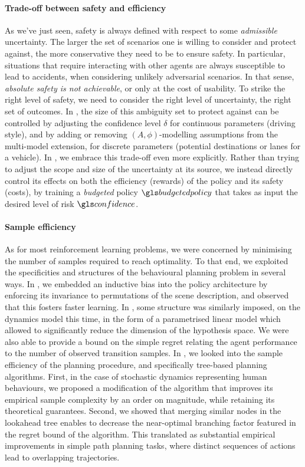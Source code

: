 \paragraph{Trade-off between safety and efficiency}
As we've just seen, safety is always defined with respect to some \emph{admissible} uncertainty. The larger the set of scenarios one is willing to consider and protect against, the more conservative they need to be to ensure safety. In particular, situations that require interacting with other agents are always susceptible to lead to accidents, when considering unlikely adversarial scenarios. In that sense, \emph{absolute safety is not achievable}, or only at the cost of usability. To strike the right level of safety, we need to consider the right level of uncertainty, the right set of outcomes. In , the size of this ambiguity set to protect against can be controlled by adjusting the confidence level $\delta$ for continuous parameters (\eg driving style), and by adding or removing $(A,\phi)$-modelling assumptions from the multi-model extension, for discrete parameters (\eg potential destinations or lanes for a vehicle). In , we embrace this trade-off even more explicitly. Rather than trying to adjust the scope and size of the uncertainty at its source, we instead directly control its effects on both the efficiency (rewards) of the policy and its safety (costs), by training a \emph{budgeted} policy $\budgetedpolicy$ that takes as input the desired level of risk $\confidence$.

\paragraph{Sample efficiency}
As for most reinforcement learning problems, we were concerned by minimising the number of samples required to reach optimality. To that end, we exploited the specificities and structures of the behavioural planning problem in several ways. In , we embedded an inductive bias into the policy architecture by enforcing its invariance to permutations of the scene description, and observed that this fosters faster learning. 
In , some structure was similarly imposed, on the dynamics model this time, in the form of a parametrised linear model which allowed to significantly reduce the dimension of the hypothesis space. We were also able to provide a bound on the simple regret relating the agent performance to the number of observed transition samples. In , we looked into the sample efficiency of the planning procedure, and specifically tree-based planning algorithms. First, in the case of stochastic dynamics representing human behaviours, we proposed a modification of the \OLOP algorithm that improves its empirical sample complexity by an order on magnitude, while retaining its theoretical guarantees. Second, we showed that merging similar nodes in the lookahead tree enables to decrease the near-optimal branching factor featured in the regret bound of the algorithm. This translated as substantial empirical improvements in simple path planning tasks, where distinct sequences of actions lead to overlapping trajectories.


